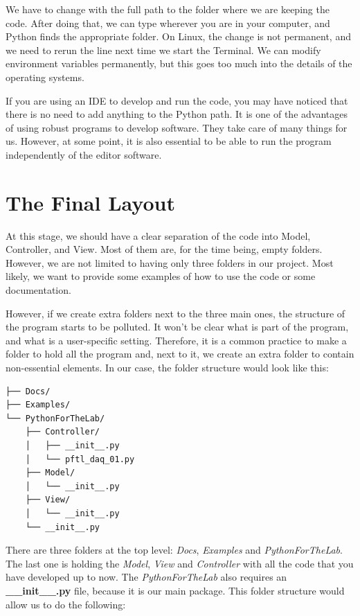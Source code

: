We have to change  with the full path to the folder where we are keeping the code. After doing that, we can type  wherever you are in your computer, and Python finds the appropriate folder. On Linux, the change is not permanent, and we need to rerun the line next time we start the Terminal. We can modify environment variables permanently, but this goes too much into the details of the operating systems.

If you are using an IDE to develop and run the code, you may have noticed that there is no need to add anything to the Python path. It is one of the advantages of using robust programs to develop software. They take care of many things for us. However, at some point, it is also essential to be able to run the program independently of the editor software.

\section{The Final Layout}\label{sec:final-layout}
At this stage, we should have a clear separation of the code into Model, Controller, and View. Most of them are, for the time being, empty folders. However, we are not limited to having only three folders in our project. Most likely, we want to provide some examples of how to use the code or some documentation.

However, if we create extra folders next to the three main ones, the structure of the program starts to be polluted. It won't be clear what is part of the program, and what is a user-specific setting. Therefore, it is a common practice to make a folder to hold all the program and, next to it, we create an extra folder to contain non-essential elements. In our case, the folder structure would look like this:

\begin{verbatim}
├── Docs/
├── Examples/
└── PythonForTheLab/
    ├── Controller/
    │   ├── __init__.py
    │   └── pftl_daq_01.py
    ├── Model/
    │   └── __init__.py
    ├── View/
    │   └── __init__.py
    └── __init__.py
\end{verbatim}

There are three folders at the top level: \emph{Docs}, \emph{Examples} and \emph{PythonForTheLab}. The last one is holding the \emph{Model}, \emph{View} and \emph{Controller} with all the code that you have developed up to now. The \emph{PythonForTheLab} also requires an \textbf{\_\_init\_\_.py} file, because it is our main package. This folder structure would allow us to do the following:

